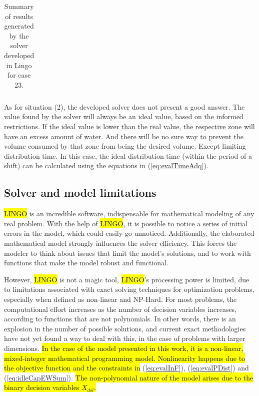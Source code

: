 \documentclass{singlecol}
\theoremstyle{TH}{
\newtheorem{lemma}{Lemma}
\newtheorem{theorem}[lemma]{Theorem}
\newtheorem{corrolary}[lemma]{Corrolary}
\newtheorem{conjecture}[lemma]{Conjecture}
\newtheorem{proposition}[lemma]{Proposition}
\newtheorem{claim}[lemma]{Claim}
\newtheorem{stheorem}[lemma]{Wrong Theorem}
\newtheorem{algorithm}{Algorithm}
}
\theoremstyle{THrm}{
\newtheorem{definition}{Definition}[section]
\newtheorem{question}{Question}[section]
\newtheorem{remark}{Remark}
\newtheorem{scheme}{Scheme}
}
\theoremstyle{THhit}{
\newtheorem{case}{Case}[section]
}
\begin{document}
\begin{table}[t]
\begin{center}
\begin{small}
\begin{tabular}{ c r r r r r }
	\end{tabular}
\caption{Summary of results generated by the solver developed in Lingo for case 23.}
\label{tab:lingoEvaluationsCase23}
\end{small}
\end{center}
\end{table}

As for situation (2), the developed solver does not present a good answer. The value found by the solver will always be an ideal value, based on the informed restrictions. If the ideal value is lower than the real value, the respective zone will have an excess amount of water. And there will be no sure way to prevent the volume consumed by that zone from being the desired volume. Except limiting distribution time. In this case, the ideal distribution time (within the period of a shift) can be calculated using the equations in (\ref{eq:evalTimeAdq}). 

\subsection{Solver and model limitations}
\label{sec:limitations}

\hl{LINGO} is an incredible software, indispensable for mathematical modeling of any real problem. With the help of \hl{LINGO}, it is possible to notice a series of initial errors in the model, which could easily go unnoticed. Additionally, the elaborated mathematical model strongly influences the solver efficiency. This forces the modeler to think about issues that limit the model's solutions, and to work with functions that make the model robust and functional.

However, \hl{LINGO} is not a magic tool, \hl{LINGO}'s processing power is limited, due to limitations associated with exact solving techniques for optimization problems, especially when defined as non-linear and NP-Hard. For most problems, the computational effort increases as the number of decision variables increases, according to functions that are not polynomials. In other words, there is an explosion in the number of possible solutions, and current exact methodologies have not yet found a way to deal with this, in the case of problems with larger dimensions. \hl{In the case of the model presented in this work, it is a non-linear, mixed-integer mathematical programming model. Nonlinearity happens due to the objective function and the constraints in} (\ref{eq:evalInF}), (\ref{eq:evalPDist}) and (\ref{eq:idleCapEWSum}). \hl{The non-polynomial nature of the model arises due to the binary decision variables $X_{dsl}$.}
\end{document}
